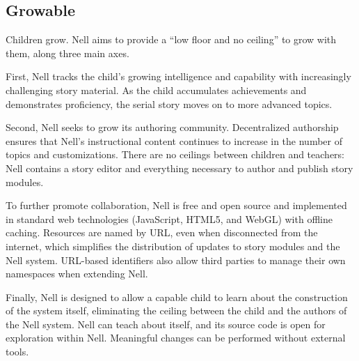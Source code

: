 \documentclass{sig-alternate}
\begin{document}
\subsection{Growable}



Children grow.  Nell aims to provide a ``low floor and no ceiling'' to
grow with them, along three main axes.

First, Nell tracks the child's growing intelligence and capability
with increasingly challenging story material.  As the child
accumulates achievements and demonstrates
proficiency, the serial story moves on to more advanced topics.

Second, Nell seeks to grow its authoring community.  Decentralized
authorship ensures that Nell's instructional content
continues to increase in the number of topics and
customizations.  There are no
ceilings between children and teachers: Nell
contains a story editor and everything necessary to
author and publish story modules.

To further promote collaboration,
Nell is free and open source and implemented in standard web
technologies (JavaScript, HTML5, and WebGL) with offline caching.
Resources are named by URL, even when disconnected from the
internet, which simplifies the distribution of updates to story modules and
the Nell system.  URL-based identifiers also allow third parties
to manage their own namespaces when extending Nell.

Finally, Nell is designed to allow a capable child to learn about
the construction of the system itself,
eliminating the ceiling between the child and
the authors of the Nell system.  Nell can teach
about itself, and its source code is open for exploration within Nell.
Meaningful changes can be performed without external tools.
\end{document}
